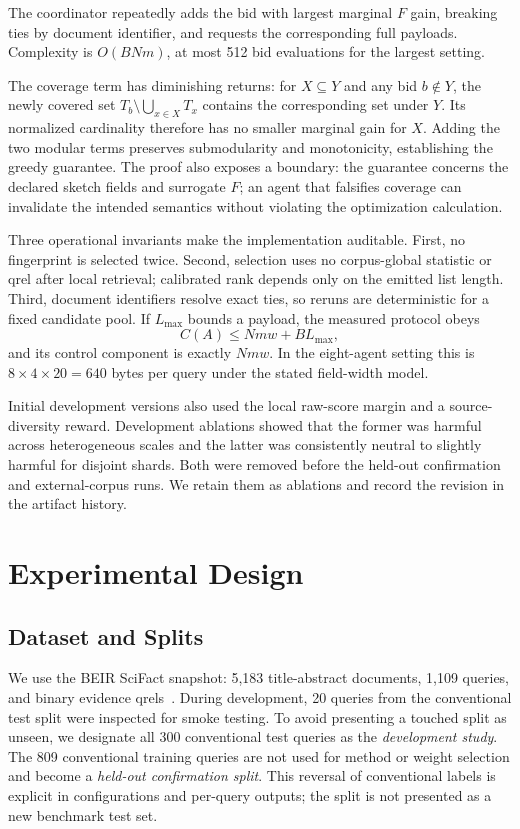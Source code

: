 \documentclass[sigconf]{acmart}
\begin{document}
The coordinator repeatedly adds the bid with largest marginal $F$ gain, breaking ties by document identifier, and requests the corresponding full payloads. Complexity is $O(BNm)$, at most 512 bid evaluations for the largest setting.

The coverage term has diminishing returns: for $X\subseteq Y$ and any bid $b\notin Y$, the newly covered set $T_b\setminus\bigcup_{x\in X}T_x$ contains the corresponding set under $Y$. Its normalized cardinality therefore has no smaller marginal gain for $X$. Adding the two modular terms preserves submodularity and monotonicity, establishing the greedy guarantee. The proof also exposes a boundary: the guarantee concerns the declared sketch fields and surrogate $F$; an agent that falsifies coverage can invalidate the intended semantics without violating the optimization calculation.

Three operational invariants make the implementation auditable. First, no fingerprint is selected twice. Second, selection uses no corpus-global statistic or qrel after local retrieval; calibrated rank depends only on the emitted list length. Third, document identifiers resolve exact ties, so reruns are deterministic for a fixed candidate pool. If $L_{\max}$ bounds a payload, the measured protocol obeys
\begin{equation}
 C(A)\leq Nmw+B L_{\max},
\end{equation}
and its control component is exactly $Nmw$. In the eight-agent setting this is $8\times4\times20=640$ bytes per query under the stated field-width model.

Initial development versions also used the local raw-score margin and a source-diversity reward. Development ablations showed that the former was harmful across heterogeneous scales and the latter was consistently neutral to slightly harmful for disjoint shards. Both were removed before the held-out confirmation and external-corpus runs. We retain them as ablations and record the revision in the artifact history.

\section{Experimental Design}

\subsection{Dataset and Splits}

We use the BEIR SciFact snapshot: 5,183 title-abstract documents, 1,109 queries, and binary evidence qrels~\cite{wadden2020scifact,thakur2021beir}. During development, 20 queries from the conventional test split were inspected for smoke testing. To avoid presenting a touched split as unseen, we designate all 300 conventional test queries as the \emph{development study}. The 809 conventional training queries are not used for method or weight selection and become a \emph{held-out confirmation split}. This reversal of conventional labels is explicit in configurations and per-query outputs; the split is not presented as a new benchmark test set.
\end{document}
